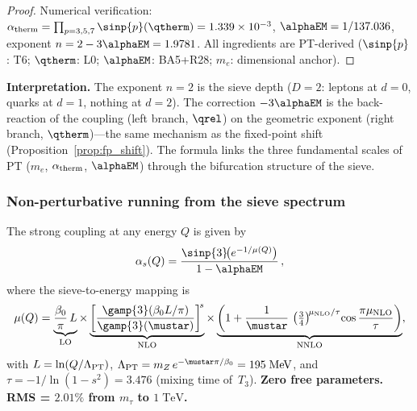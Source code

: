 \documentclass[12pt,a4paper]{article}
\begin{document}
\begin{proof}
Numerical verification: $\alpha_{\rm therm}
= \prod_{p=3,5,7}\sinp{p}(\qtherm) = 1.339 \times 10^{-3}$,
$\alphaEM = 1/137.036$, exponent $n = 2 - 3\alphaEM = 1.9781$.
All ingredients are PT-derived ($\sinp{p}$: T6; $\qtherm$: L0;
$\alphaEM$: BA5+R28; $m_e$: dimensional anchor).
\end{proof}

\noindent
\textbf{Interpretation.}  The exponent $n = 2$ is the sieve depth
($D = 2$: leptons at $d = 0$, quarks at $d = 1$, nothing at $d = 2$).
The correction $-3\alphaEM$ is the back-reaction of the coupling
(left branch, $\qrel$) on the geometric exponent (right branch,
$\qtherm$)---the same mechanism as the fixed-point shift
(Proposition~\ref{prop:fp_shift}).  The formula links the three
fundamental scales of PT ($m_e$, $\alpha_{\rm therm}$, $\alphaEM$)
through the bifurcation structure of the sieve.

\subsubsection{Non-perturbative running from the sieve spectrum}
\label{sec:ch9_running}

\begin{proposition}
\label{prop:NNLO_running}
The strong coupling at any energy $Q$ is given by
\begin{equation}
  \alpha_s(Q)
  = \frac{\sinp{3}\!\bigl(e^{-1/\mu(Q)}\bigr)}{1 - \alphaEM}\,,
  \label{eq:alpha_s_exact}
\end{equation}
where the sieve-to-energy mapping is
\begin{equation}
  \mu(Q) = \underbrace{\frac{\beta_0}{\pi}\,L}_{\rm LO}
  \times
  \underbrace{\left[\frac{\gamp{3}(\beta_0 L/\pi)}
                         {\gamp{3}(\mustar)}\right]^{\!s}}_{\rm NLO}
  \times
  \underbrace{\left(1 + \frac{1}{\mustar}\,
  \left(\tfrac{3}{4}\right)^{\!\mu_{\rm NLO}/\tau}
  \!\cos\frac{\pi\mu_{\rm NLO}}{\tau}\right)}_{\rm NNLO},
  \label{eq:NNLO_mapping}
\end{equation}
with $L = \ln(Q/\Lambda_{\rm PT})$,
$\Lambda_{\rm PT} = m_Z\,e^{-\mustar\pi/\beta_0} = 195\;\mathrm{MeV}$,
and $\tau = -1/\ln(1-s^2) = 3.476$ (mixing time of~$T_3$).
\textbf{Zero free parameters.  RMS = $2.01\%$ from $m_\tau$ to
$1\;\mathrm{TeV}$.}
\end{proposition}
\end{document}
